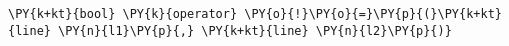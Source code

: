 \begin{Verbatim}[commandchars=\\\{\}]
    \PY{k+kt}{bool} \PY{k}{operator} \PY{o}{!}\PY{o}{=}\PY{p}{(}\PY{k+kt}{line} \PY{n}{l1}\PY{p}{,} \PY{k+kt}{line} \PY{n}{l2}\PY{p}{)}
\end{Verbatim}
